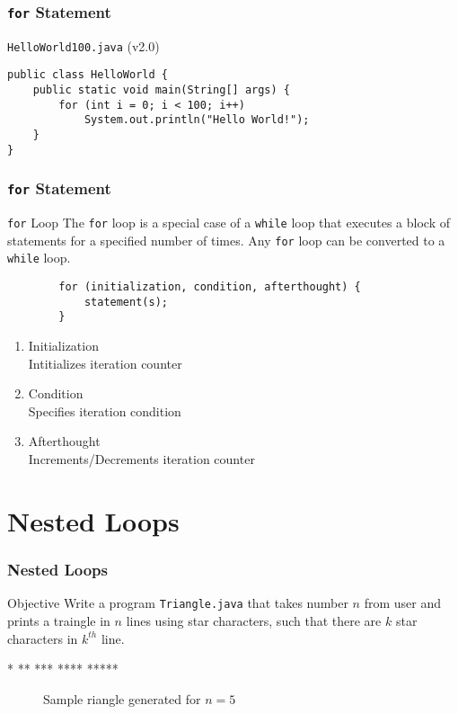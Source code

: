 \documentclass[10pt, compress]{beamer}
\begin{document}
\begin{frame}[fragile]
	\frametitle{\texttt{for} Statement}
	\begin{block}{\texttt{HelloWorld100.java} (v2.0)}
		\begin{verbatim}
public class HelloWorld {
	public static void main(String[] args) {
		for (int i = 0; i < 100; i++)
			System.out.println("Hello World!");
	}
}
		\end{verbatim}
	\end{block}
\end{frame}

\begin{frame}[fragile]
	\frametitle{\texttt{for} Statement}
	\begin{block}{\texttt{for} Loop}
		The \texttt{for} loop is a special case of a \texttt{while} loop that executes a block of statements for a specified number of times. Any \texttt{for} loop can be converted to a \texttt{while} loop.
		\begin{verbatim}
		for (initialization, condition, afterthought) {
			statement(s);
		}
		\end{verbatim}
		\begin{enumerate}
			\item Initialization\\Intitializes iteration counter
			\item Condition\\Specifies iteration condition
			\item Afterthought\\Increments/Decrements iteration counter
		\end{enumerate}
	\end{block}
\end{frame}

\section{Nested Loops}

\begin{frame}[fragile]
	\frametitle{Nested Loops}
	\begin{block}{Objective}
		Write a program \texttt{Triangle.java} that takes number $n$ from user and prints a traingle in $n$ lines using star characters, such that there are $k$ star characters in $k^{th}$ line.
\begin{verbbox}
*
**
***
****
*****
\end{verbbox}
		\begin{figure}[H]\centering
		\theverbbox
		\caption{Sample riangle generated for $n = 5$}
		\end{figure}
	\end{block}
\end{frame}
\end{document}
